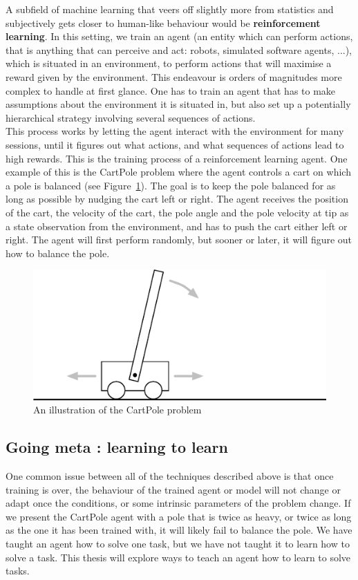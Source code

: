 A subfield of machine learning that veers off slightly more
from statistics and subjectively gets closer to human-like behaviour
would be \textbf{reinforcement learning}. In this setting, we train an agent
(an entity which can perform actions, that is anything that can perceive and
act: robots, simulated software agents, ...), 
which is situated in an environment, to perform actions that will maximise
a reward given by the environment. This endeavour is orders of magnitudes more
complex to handle at first glance. One has to train an agent that has to make
assumptions about the environment it is situated in, but also set up a
potentially hierarchical strategy involving several sequences of actions.\\

This process works by letting the agent interact with the environment for many
sessions, until it figures out what actions, and what sequences of actions lead
to high rewards. This is the training process of a reinforcement learning agent.
One example of this is the CartPole problem \cite{barto-cartpole} where the
agent controls a cart on which a pole is balanced (see
Figure~\ref{fig:cartpole_illustration}). The goal is to keep the
pole balanced for as long as possible by nudging the cart left or right. The
agent receives the position of the cart, the velocity of the cart, the pole
angle and the pole velocity at tip as a state observation from the environment,
and has to push the cart either left or right. The agent will first perform
randomly, but sooner or later, it will figure out how to balance the pole.\\

\begin{figure}[H]
	\centering
	\includegraphics[width=0.8\linewidth]{fig/cartpole.eps}
	\caption{An illustration of the CartPole problem}
	\label{fig:cartpole_illustration}
\end{figure}

\subsection{Going meta : learning to learn}
One common issue between all of the techniques described above is that once
training is over, the behaviour of the trained agent or model will not change
or adapt once the conditions, or some intrinsic parameters of the problem
change. If we present the CartPole agent with a pole that is twice as heavy,
or twice as long as the one it has been trained with, it will likely fail to 
balance the pole. We have taught an agent how to solve one task, but we have
not taught it to learn how to solve a task. This thesis will explore ways to 
teach an agent how to learn to solve tasks.\\

